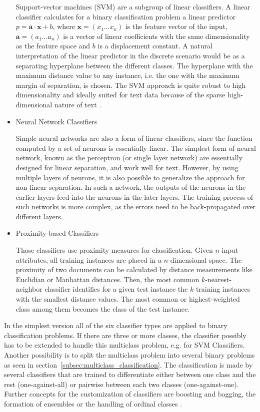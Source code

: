 \documentclass[article,type=msc,colorback,accentcolor=tud7b]{tudthesis}
\begin{document}
\begin{itemize}
        Support-vector machines (SVM) are a subgroup of linear classifiers. A linear classifier calculates for a binary classification problem a linear predictor $p= \mathbf{a}\cdot\mathbf{x}+b$, where $\mathbf{x}=(x_{1}...x_{n})$ is the feature vector of the input, $\mathbf{a}=(a_{1}...a_{n})$ is a vector of linear coefficients with the same dimensionality as the feature space and $b$ is a displacement constant. A natural interpretation of the linear predictor in the discrete scenario would be as a separating hyperplane between the different classes. The hyperplane with the maximum distance value to any instance, i.e. the one with the maximum margin of separation, is chosen. The SVM approach is quite robust to high dimensionality and ideally suited for text data because of the sparse high-dimensional nature of text \autocite{Joachims1997}.
      \item Neural Network Classifiers
      
        Simple neural networks are also a form of linear classifiers, since the function computed by a set of neurons is essentially linear. The simplest form of neural network, known as the perceptron (or single layer network) are essentially designed for linear separation, and work well for text. However, by using multiple layers of neurons, it is also possible to generalize the approach for non-linear separation. In such a network, the outputs of the neurons in the earlier layers feed into the neurons in the later layers. The training process of such networks is more complex, as the errors need to be back-propagated over different layers.
      \item Proximity-based Classifiers
      
        Those classifiers use proximity measures for classification. Given $n$ input attributes, all training instances are placed in a $n$-dimensional space. The proximity of two documents can be calculated by distance measurements like Euclidian or Manhattan distances. Then, the most common $k$-nearest-neighbor classifier identifies for a given test instance the $k$ training instances with the smallest distance values. The most common or highest-weighted class among them becomes the class of the test instance.
    \end{itemize}
    In the simplest version all of the six classifier types are applied to binary classification problems. If there are three or more classes, the classifier possibly has to be extended to handle this multiclass problem, e.g. for SVM Classifiers. Another possibility is to split the multiclass problem into several binary problems as seen in section~\ref{subsec:multiclass_classification}. The classification is made by several classifiers that are trained to differentiate either between one class and the rest (one-against-all) or pairwise between each two classes (one-against-one). Further concepts for the customization of classifiers are boosting and bagging, the formation of ensembles or the handling of ordinal classes \autocite{Aggarwal2012}. \\\\
\end{document}
